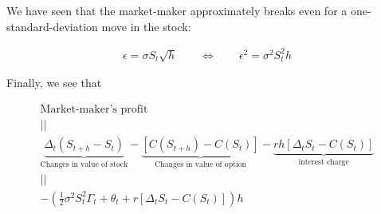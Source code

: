 \begin{frame}[fragile,t]
 \begin{center}
   We have seen that the market-maker approximately breaks even for a one-standard-deviation move in the stock:\\
   \bigskip

  \begin{align*}
    \epsilon = \sigma S_t \sqrt{h} \qquad \Longleftrightarrow \qquad
    \epsilon^2 = \sigma^2 S_t^2 h
  \end{align*}

  \bigskip
  \mySeparateLine
  \bigskip

  Finally, we see that
  \bigskip

  \begin{gather*}
    \text{Market-maker's profit}                                                 \\ || \\
     \underbrace{\Delta_t (S_{t+h}-S_t)}_{\text{Changes in value of stock}} -
     \underbrace{\left[C(S_{t+h})-C(S_t)\right]}_{\text{Changes in value of option}} -
     \underbrace{rh \left[\Delta_t S_t - C(S_t)\right]}_{\text{interest charge}} \\ || \\
     -\left(\frac{1}{2}\sigma^2 S_t^2 \Gamma_t + \theta_t + r \left[ \Delta_t S_t -C(S_t)\right]\right)h
   \end{gather*}
 \end{center}
\end{frame}
